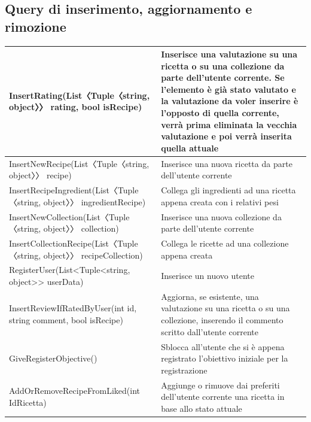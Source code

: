﻿\documentclass[a4paper,12pt]{report}
\begin{document}
\subsection{Query di inserimento, aggiornamento e\\ rimozione}
\begin{table}[h!]
    \centering
    \begin{tabular}{ |p{3in}|p{2in}| }
        \hline
        \scriptsize{InsertRating(List〈Tuple〈string, object〉〉 rating, bool isRecipe)} & \scriptsize{Inserisce una valutazione su una ricetta o su una collezione da parte dell'utente corrente. Se l'elemento è già stato valutato e la valutazione da voler inserire è l'opposto di quella corrente, verrà prima eliminata la vecchia valutazione e poi verrà inserita quella attuale} \\
        \hline
        \scriptsize{InsertNewRecipe(List〈Tuple〈string, object〉〉 recipe)} & \scriptsize{Inserisce una nuova ricetta da parte dell'utente corrente} \\
        \hline
        \scriptsize{InsertRecipeIngredient(List〈Tuple〈string, object〉〉 ingredientRecipe)} & \scriptsize{Collega gli ingredienti ad una ricetta appena creata con i relativi pesi} \\
        \hline
        \scriptsize{InsertNewCollection(List〈Tuple〈string, object〉〉 collection)} & \scriptsize{Inserisce una nuova collezione da parte dell'utente corrente} \\
        \hline
        \scriptsize{InsertCollectionRecipe(List〈Tuple〈string, object〉〉 recipeCollection)} & \scriptsize{Collega le ricette ad una collezione appena creata} \\
        \hline
        \scriptsize{RegisterUser(List<Tuple<string, object>> userData)} & \scriptsize{Inserisce un nuovo utente} \\
        \hline
        \scriptsize{InsertReviewIfRatedByUser(int id, string comment, bool isRecipe)} & \scriptsize{Aggiorna, se esistente, una valutazione su una ricetta o su una collezione, inserendo il commento scritto dall'utente corrente} \\
        \hline
        \scriptsize{GiveRegisterObjective()} & \scriptsize{Sblocca all'utente che si è appena registrato l'obiettivo iniziale per la registrazione} \\
        \hline
        \scriptsize{AddOrRemoveRecipeFromLiked(int IdRicetta)} & \scriptsize{Aggiunge o rimuove dai preferiti dell'utente corrente una ricetta in base allo stato attuale} \\
        \hline
    \end{tabular}
\end{table}
\end{document}
